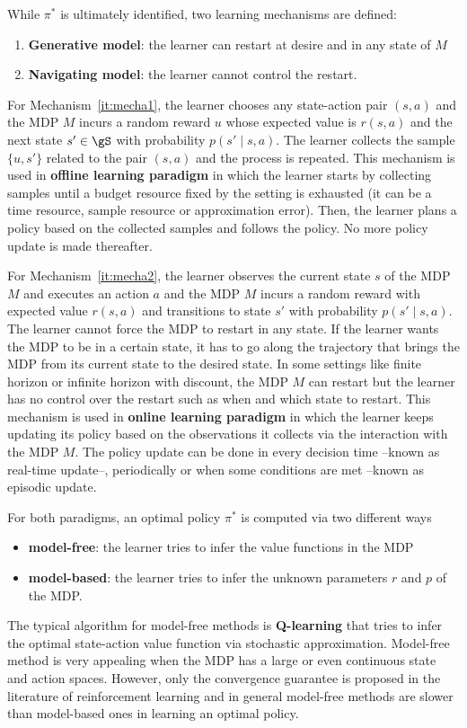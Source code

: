 While $\pi^*$ is ultimately identified, two learning mechanisms are defined:
\begin{enumerate}[label=(\roman*)]
    \item \label{it:mecha1} \textbf{Generative model}: the learner can restart at desire and in any state of $M$
    \item \label{it:mecha2} \textbf{Navigating model}: the learner cannot control the restart.
\end{enumerate}
For Mechanism~\ref{it:mecha1}, the learner chooses any state-action pair $(s,a)$ and the MDP $M$ incurs a random reward $u$ whose expected value is $r(s,a)$ and the next state $s'\in\gS$ with probability $p(s'\mid s,a)$.
The learner collects the sample $\{u,s'\}$ related to the pair $(s,a)$ and the process is repeated.
This mechanism is used in \textbf{offline learning paradigm} in which the learner starts by collecting samples until a budget resource fixed by the setting is exhausted (it can be a time resource, sample resource or approximation error). Then, the learner plans a policy based on the collected samples and follows the policy.
No more policy update is made thereafter.

For Mechanism~\ref{it:mecha2}, the learner observes the current state $s$ of the MDP $M$ and executes an action $a$ and the MDP $M$ incurs a random reward with expected value $r(s,a)$ and transitions to state $s'$ with probability $p(s'\mid s,a)$.
The learner cannot force the MDP to restart in any state.
If the learner wants the MDP to be in a certain state, it has to go along the trajectory that brings the MDP from its current state to the desired state.
In some settings like finite horizon or infinite horizon with discount, the MDP $M$ can restart but the learner has no control over the restart such as when and which state to restart.
This mechanism is used in \textbf{online learning paradigm} in which the learner keeps updating its policy based on the observations it collects via the interaction with the MDP $M$.
The policy update can be done in every decision time --known as real-time update--, periodically or when some conditions are met --known as episodic update.

For both paradigms, an optimal policy $\pi^*$ is computed via two different ways
\begin{itemize}
    \item \textbf{model-free}: the learner tries to infer the value functions in the MDP
    \item \textbf{model-based}: the learner tries to infer the unknown parameters $r$ and $p$ of the MDP.
\end{itemize}
The typical algorithm for model-free methods is \textbf{Q-learning} that tries to infer the optimal state-action value function via stochastic approximation. 
Model-free method is very appealing when the MDP has a large or even continuous state and action spaces.
However, only the convergence guarantee is proposed in the literature of reinforcement learning and in general model-free methods are slower than model-based ones in learning an optimal policy.

